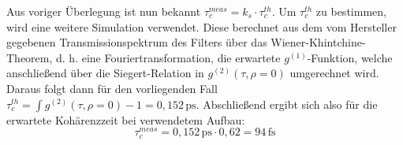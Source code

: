 Aus voriger Überlegung ist nun bekannt $\tau_c^{meas} = k_s\cdot\tau_c^{th}$. 
Um $\tau_c^{th}$ zu bestimmen, wird eine weitere Simulation verwendet. 
Diese berechnet aus dem vom Hersteller gegebenen Transmissionspektrum des Filters über das Wiener-Khintchine-Theorem, d. h. eine Fouriertransformation, die erwartete $g^{(1)}$-Funktion, welche anschließend über die Siegert-Relation in $g^{(2)}(\tau, \rho=0)$ umgerechnet wird. 
Daraus folgt dann für den vorliegenden Fall $\tau_c^{th} = \int g^{(2)}(\tau, \rho=0) -1 = 0,152\,\mathrm{ps}$. 
Abschließend ergibt sich also für die erwartete Kohärenzzeit bei verwendetem Aufbau:
\begin{equation}
    \tau_c^{meas} = 0,152\,\mathrm{ps}\cdot 0,62 = 94\,\mathrm{fs}
    \label{eq:tau_c_th}
\end{equation}


